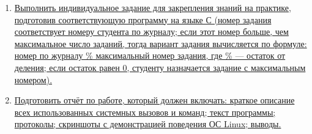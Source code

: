 \begin{enumerate}
        \item \hyperref[sec:6]{Выполнить индивидуальное задание для закрепления знаний на практике, подготовив соответствующую программу на языке С (номер задания соответствует номеру студента по журналу; если этот номер больше, чем максимальное число заданий, тогда вариант задания вычисляется по формуле: номер по журналу \% максимальный номер задания, где \% — остаток от деления; если остаток равен 0, студенту назначается задание с максимальным номером).}
        
        \item \hyperref[sec:7]{Подготовить отчёт по работе, который должен включать: краткое описание всех использованных системных вызовов и команд; текст программы; протоколы; скриншоты с демонстрацией поведения ОС Linux; выводы.}
    \end{enumerate}